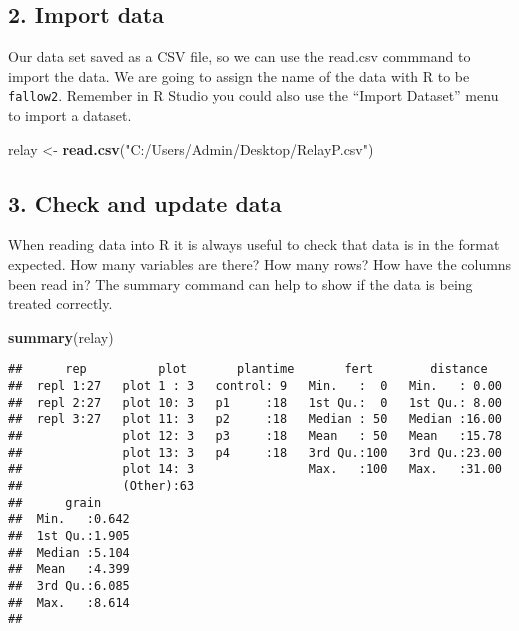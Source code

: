 \documentclass[]{book}
\newenvironment{Shaded}{\begin{snugshade}}{\end{snugshade}}
\newcommand{\KeywordTok}[1]{\textcolor[rgb]{0.13,0.29,0.53}{\textbf{#1}}}
\newcommand{\StringTok}[1]{\textcolor[rgb]{0.31,0.60,0.02}{#1}}
\newcommand{\NormalTok}[1]{#1}
\theoremstyle{definition}
\theoremstyle{definition}
\theoremstyle{definition}
\theoremstyle{remark}
\begin{document}
\subsection{2. Import data}\label{import-data-3}

Our data set saved as a CSV file, so we can use the read.csv commmand to
import the data. We are going to assign the name of the data with R to
be \texttt{fallow2}. Remember in R Studio you could also use the
``Import Dataset'' menu to import a dataset.

\begin{Shaded}
\begin{Highlighting}[]
\NormalTok{relay <-}\StringTok{ }\KeywordTok{read.csv}\NormalTok{(}\StringTok{"C:/Users/Admin/Desktop/RelayP.csv"}\NormalTok{)}
\end{Highlighting}
\end{Shaded}

\subsection{3. Check and update data}\label{check-and-update-data-3}

When reading data into R it is always useful to check that data is in
the format expected. How many variables are there? How many rows? How
have the columns been read in? The summary command can help to show if
the data is being treated correctly.

\begin{Shaded}
\begin{Highlighting}[]
\KeywordTok{summary}\NormalTok{(relay)}
\end{Highlighting}
\end{Shaded}

\begin{verbatim}
##      rep          plot       plantime       fert        distance    
##  repl 1:27   plot 1 : 3   control: 9   Min.   :  0   Min.   : 0.00  
##  repl 2:27   plot 10: 3   p1     :18   1st Qu.:  0   1st Qu.: 8.00  
##  repl 3:27   plot 11: 3   p2     :18   Median : 50   Median :16.00  
##              plot 12: 3   p3     :18   Mean   : 50   Mean   :15.78  
##              plot 13: 3   p4     :18   3rd Qu.:100   3rd Qu.:23.00  
##              plot 14: 3                Max.   :100   Max.   :31.00  
##              (Other):63                                             
##      grain      
##  Min.   :0.642  
##  1st Qu.:1.905  
##  Median :5.104  
##  Mean   :4.399  
##  3rd Qu.:6.085  
##  Max.   :8.614  
## 
\end{verbatim}
\end{document}
